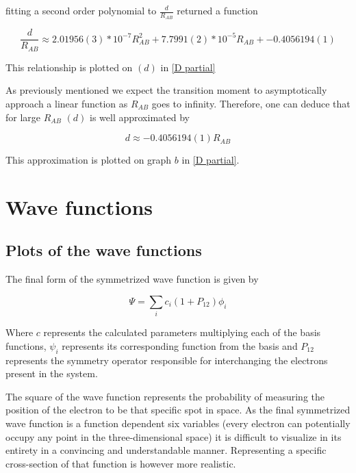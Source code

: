 \documentclass{pracalicmgr}
\begin{document}
fitting a second order polynomial to $\frac{d}{R_{AB}}$ returned a function

\begin{equation}
    \frac{d}{R_{AB}}\approx 2.01956(3)*10^{-7}R_{AB}^2+7.7991(2)*10^{-5}R_{AB} + -0.4056194(1)
\end{equation}

This relationship is plotted on $(d)$ in \ref{D partial}

As previously mentioned we expect the transition moment to asymptotically approach a linear function as $R_{AB}$ goes to infinity. Therefore, one can deduce that for large $R_{AB}$ $(d)$ is well approximated by 

\begin{equation}
    d\approx -0.4056194(1)R_{AB}
\end{equation}

This approximation is plotted on graph $b$ in \ref{D partial}.

\chapter{Wave functions}

\section{Plots of the wave functions}

The final form of the symmetrized wave function is given by 

\begin{equation}
    \Psi = \sum_i c_i\left(1+P_{12}\right) \phi_i
    \label{wave function}
\end{equation}

Where $c$ represents the calculated parameters multiplying each of the basis functions, $\psi_i$ represents its corresponding function from the basis and $P_{12}$ represents the symmetry operator responsible for interchanging the electrons present in the system.

The square of the wave function represents the probability of measuring the position of the electron to be that specific spot in space. As the final symmetrized wave function is a function dependent six variables (every electron can potentially occupy any point in the three-dimensional space) it is difficult to visualize in its entirety in a convincing and understandable manner. Representing a specific cross-section of that function is however more realistic.
\end{document}

